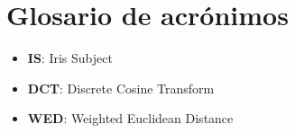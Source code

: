\chapter*{Glosario de acrónimos}

\begin{itemize}
\item{\textbf{IS}:  Iris Subject}
\item{\textbf{DCT}: Discrete Cosine Transform}
\item{\textbf{WED}: Weighted Euclidean Distance}

\end{itemize}

\newpage \thispagestyle{empty} %

